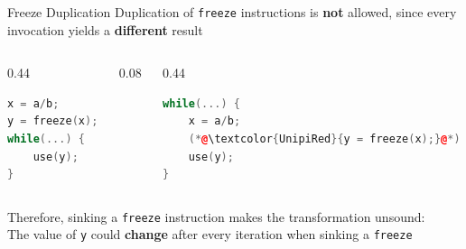 \begin{frame}[fragile]{Freeze Duplication}
  Duplication of \texttt{freeze} instructions is \textbf{not} allowed, since every invocation yields a \textbf{different} result
    \begin{columns}[c]
        \begin{column}{0.44\textwidth}
            \begin{lstlisting}[language=C++, frame=single, xleftmargin=4pt, xrightmargin=4pt]
x = a/b;
y = freeze(x);
while(...) {
    use(y);
}
            \end{lstlisting}
        \end{column}
        \begin{column}{0.08\textwidth}
            \illegaltransform
        \end{column}
        \begin{column}{0.44\textwidth}
           \begin{lstlisting}[language=C++, frame=single, xleftmargin=4pt, xrightmargin=4pt]
while(...) {
    x = a/b;
    (*@\textcolor{UnipiRed}{y = freeze(x);}@*)
    use(y);
}     
           \end{lstlisting} 
        \end{column}
    \end{columns}
    Therefore, sinking a \texttt{freeze} instruction makes the transformation unsound:\\
The value of \texttt{y} could \textbf{change} after every iteration when sinking a \texttt{freeze}


\end{frame}
